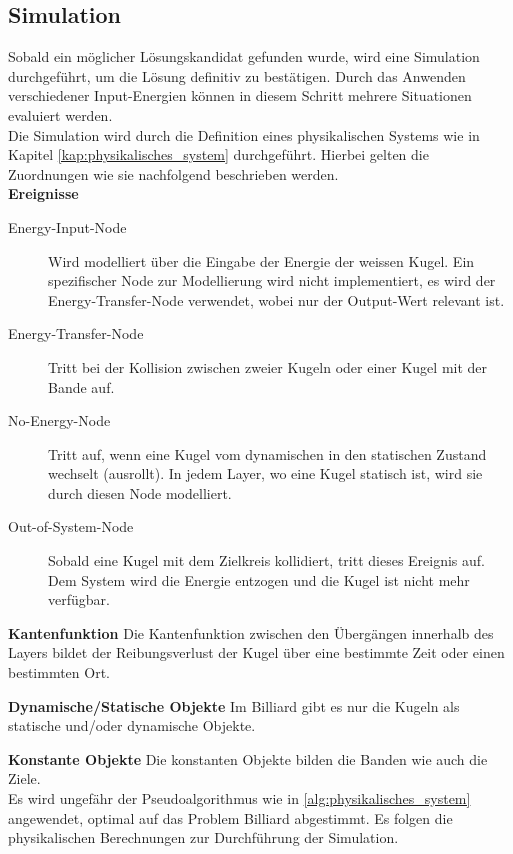 \subsection{Simulation}
Sobald ein möglicher Lösungskandidat gefunden wurde, wird eine Simulation durchgeführt, um
die Lösung definitiv zu bestätigen. Durch das Anwenden verschiedener Input-Energien können in diesem Schritt mehrere
Situationen evaluiert werden.
\\

Die Simulation wird durch die Definition eines physikalischen Systems wie in Kapitel \ref{kap:physikalisches_system} durchgeführt.
Hierbei gelten die Zuordnungen wie sie nachfolgend beschrieben werden.\\
\textbf{Ereignisse}
\begin{description}
    \item[Energy-Input-Node] Wird modelliert über die Eingabe der Energie der weissen Kugel. Ein spezifischer Node zur
    Modellierung wird nicht implementiert, es wird der Energy-Transfer-Node verwendet, wobei nur der Output-Wert relevant ist.
    \item[Energy-Transfer-Node] Tritt bei der Kollision zwischen zweier Kugeln oder einer Kugel mit der Bande auf.
    \item[No-Energy-Node] Tritt auf, wenn eine Kugel vom dynamischen in den statischen Zustand wechselt (ausrollt). In jedem
    Layer, wo eine Kugel statisch ist, wird sie durch diesen Node modelliert.
    \item[Out-of-System-Node] Sobald eine Kugel mit dem Zielkreis kollidiert, tritt dieses Ereignis auf. Dem System wird die
    Energie entzogen und die Kugel ist nicht mehr verfügbar.
\end{description}

\textbf{Kantenfunktion}
Die Kantenfunktion zwischen den Übergängen innerhalb des Layers bildet der Reibungsverlust der
Kugel über eine bestimmte Zeit oder einen bestimmten Ort.

\textbf{Dynamische/Statische Objekte}
Im Billiard gibt es nur die Kugeln als statische und/oder dynamische Objekte.

\textbf{Konstante Objekte}
Die konstanten Objekte bilden die Banden wie auch die Ziele.
\\

Es wird ungefähr der Pseudoalgorithmus wie in \ref{alg:physikalisches_system} angewendet, optimal auf das Problem \glqq{} Billiard\grqq{}
abgestimmt. Es folgen die physikalischen Berechnungen zur Durchführung der Simulation.

